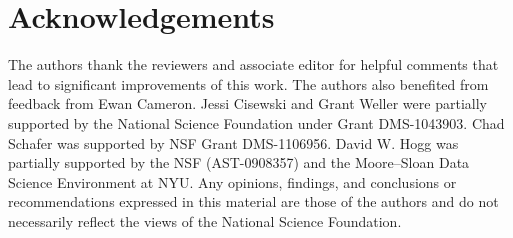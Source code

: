 \documentclass[12pt]{article}
\begin{document}
\section*{Acknowledgements}
The authors thank the reviewers and associate editor for helpful comments that lead to significant improvements of this work.  The authors also benefited from feedback from Ewan Cameron.  Jessi Cisewski and Grant Weller were partially supported by the National Science Foundation under Grant DMS-1043903. 
Chad Schafer was supported by NSF Grant DMS-1106956.  David W. Hogg was partially supported by the NSF (AST-0908357) and the Moore--Sloan Data Science Environment at NYU.
Any opinions, findings, and conclusions or recommendations expressed in this material are those of the authors and do not necessarily reflect the views of the National Science Foundation.








\end{document}
